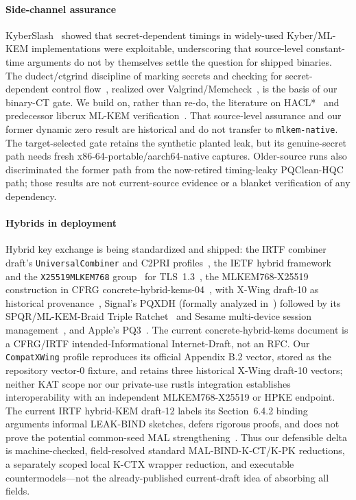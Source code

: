 \documentclass[journal]{IEEEtran}
\newcommand{\code}[1]{\texttt{\small #1}}
\begin{document}
\paragraph*{Side-channel assurance}
KyberSlash~\cite{kyberslash} showed that secret-dependent timings in widely-used Kyber/ML-KEM
implementations were exploitable, underscoring that source-level constant-time arguments do not by
themselves settle the question for shipped binaries. The dudect/ctgrind discipline of marking
secrets and checking for secret-dependent control flow~\cite{dudect,ctgrind}, realized over
Valgrind/Memcheck~\cite{valgrind}, is the basis of our binary-CT gate. We build on, rather than
re-do, the literature on HACL*~\cite{hacl} and predecessor libcrux ML-KEM
verification~\cite{libcrux}. That source-level assurance and our former dynamic zero result are
historical and do not transfer to \code{mlkem-native}. The target-selected gate retains the synthetic planted
leak, but its genuine-secret path needs fresh x86-64-portable/aarch64-native captures. Older-source runs also
discriminated the former path from the now-retired timing-leaky PQClean-HQC path; those results are
not current-source evidence or a blanket verification of any dependency.

\paragraph*{Hybrids in deployment}
Hybrid key exchange is being standardized and shipped: the IRTF combiner draft's
\code{UniversalCombiner} and C2PRI profiles~\cite{hybridkems}, the IETF hybrid framework~\cite{rfc9954} and
the \code{X25519MLKEM768} group~\cite{rfc10024} for TLS~1.3~\cite{rfc9846,rfc7748}, the
MLKEM768-X25519 construction in CFRG concrete-hybrid-kems-04~\cite{concretehybrid}, with
X-Wing draft-10 as historical provenance~\cite{xwing}, Signal's PQXDH (formally analyzed in~\cite{pqxdh}) followed by its
SPQR/ML-KEM-Braid Triple Ratchet~\cite{signaldr4,mlkembraid,signalspqr} and Sesame
multi-device session management~\cite{sesame}, and Apple's PQ3~\cite{pq3}.
The current concrete-hybrid-kems document is a CFRG/IRTF intended-Informational
Internet-Draft, not an RFC. Our \code{CompatXWing} profile reproduces its official Appendix B.2
vector, stored as the repository vector-0 fixture, and retains three historical X-Wing draft-10
vectors; neither KAT scope nor our private-use
rustls integration establishes interoperability with an independent MLKEM768-X25519 or HPKE endpoint.
The current IRTF hybrid-KEM draft-12 labels its Section~6.4.2 binding arguments informal
LEAK-BIND sketches, defers rigorous proofs, and does not prove the potential common-seed MAL
strengthening~\cite{hybridkems}. Thus our defensible delta is machine-checked, field-resolved
standard MAL-BIND-K-CT/K-PK reductions, a separately scoped local K-CTX wrapper reduction, and
executable countermodels---not the already-published current-draft idea of absorbing all fields.
\end{document}
